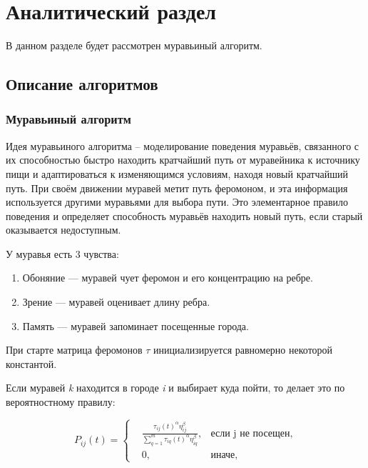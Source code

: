 \documentclass[a4paper,12pt]{article}
\begin{document}
\newpage
\section{Аналитический раздел}
	
В данном разделе будет рассмотрен муравьиный алгоритм.
	
\subsection{Описание алгоритмов}

\subsubsection{Муравьиный алгоритм}

Идея муравьиного алгоритма – моделирование поведения муравьёв, связанного с их способностью быстро
находить кратчайший путь от муравейника к источнику пищи и адаптироваться к изменяющимся условиям,
находя новый кратчайший путь. При своём движении муравей метит путь феромоном, и эта информация
используется другими муравьями для выбора пути. Это элементарное правило поведения и определяет
способность муравьёв находить новый путь, если старый оказывается недоступным.
~\cite{stovba}

У муравья есть 3 чувства: 
	
	\begin{enumerate}
		\item Обоняние --- муравей чует феромон и его концентрацию на ребре. 
		\item Зрение --- муравей оценивает длину ребра. 
		\item Память --- муравей запоминает посещенные города.  
	\end{enumerate}
	
	При старте матрица феромонов $\tau$ инициализируется равномерно некоторой константой. 
	
	Если муравей \textit{k} находится в городе \textit{i} и выбирает куда пойти, то делает это по вероятностному правилу: 
	
\begin{equation}
P_{ij}(t) =  \left\{
\begin{aligned}
&\frac{{\tau_{ij}(t)}^{\alpha} \eta_{ij}^{\beta}}{\sum_{q=1}^m {\tau_{iq}(t)}^{\alpha} \eta_{iq}^{\beta}}, &\text{если j не посещен,}\\
&0, &\text{иначе,}
\end{aligned}
\right.
\label{p0}
\end{equation}
\end{document}
